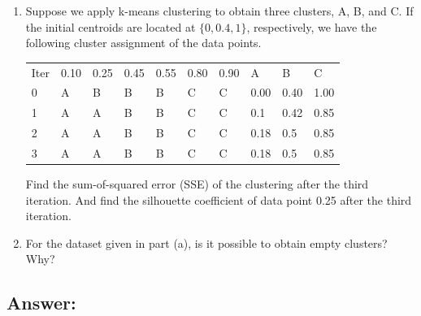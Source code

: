 \documentclass{article}
\begin{document}
\begin{enumerate}[label= (\alph*)]
    \item Suppose we apply k-means clustering to obtain three clusters, A, B, and C. If the initial centroids are located at $\{0,0.4,1\}$, respectively, we have the following cluster assignment of the data points.
    \begin{table}[ht]
        \begin{tabular}{llllllllll}
        Iter & 0.10 & 0.25 & 0.45 & 0.55 & 0.80 & 0.90 & A & B & C \\
        0 & A & B & B & B & C & C & 0.00 & 0.40 & 1.00 \\
        1 & A & A & B & B & C & C & 0.1 & 0.42 & 0.85 \\ 
        2 & A & A & B & B & C & C & 0.18 & 0.5 & 0.85 \\ 
        3 & A & A & B & B & C & C & 0.18 & 0.5 & 0.85 
        \end{tabular}
    \end{table}

    Find the sum-of-squared error (SSE) of the clustering after the third iteration. And find the silhouette coefficient of data point 0.25 after the third iteration.

    \item For the dataset given in part (a), is it possible to obtain empty clusters? Why?
\end{enumerate}

\subsection*{Answer:}
\end{document}
